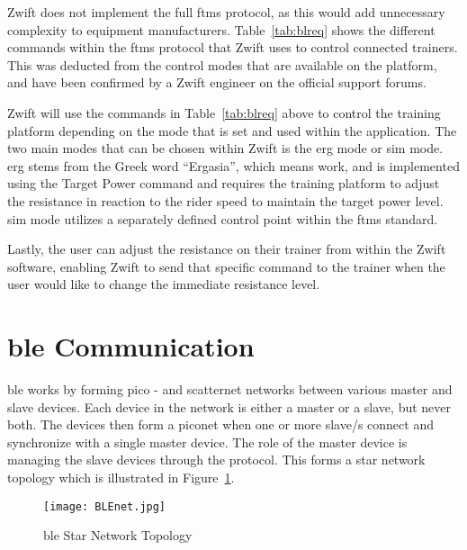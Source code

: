 \vspace*{-0.5cm}

Zwift does not implement the full \ac{ftms} protocol, as this would add unnecessary complexity to equipment manufacturers. Table~\ref{tab:blreq} shows the different commands within the \ac{ftms} protocol that Zwift uses to control connected trainers. This was deducted from the control modes that are available on the platform, and have been confirmed by a Zwift engineer on the official support forums. \citep[2021]{Jeremy:2021}

Zwift will use the commands in Table~\ref{tab:blreq} above to control the training platform depending on the mode that is set and used within the application. The two main modes that can be chosen within Zwift is the \acf{erg} mode or \acf{sim} mode. \ac{erg} stems from the Greek word ``Ergasia'', which means work, and is implemented using the Target Power command and requires the training platform to adjust the resistance in reaction to the rider speed to maintain the target power level. \ac{sim} mode utilizes a separately defined control point within the \ac{ftms} standard.  \citep{Zwiftinsider:2022}

Lastly, the user can adjust the resistance on their trainer from within the Zwift software, enabling Zwift to send that specific command to the trainer when the user would like to change the immediate resistance level.

\section{\acf{ble} Communication}
\label{sec:ble}

\ac{ble} works by forming pico - and scatternet networks between various master and slave devices. Each device in the network is either a master or a slave, but never both. The devices then form a piconet when one or more slave/s connect and synchronize with a single master device. The role of the master device is managing the slave devices through the protocol. This forms a star network topology which is illustrated in Figure~\ref{fig:ble}. \citep{Townsend:2014}

\begin{figure}[H]
	\begin{center}
		\texttt{[image: BLEnet.jpg]}
		\caption{\ac{ble} Star Network Topology}
		\label{fig:ble}
	\end{center}
\end{figure}


